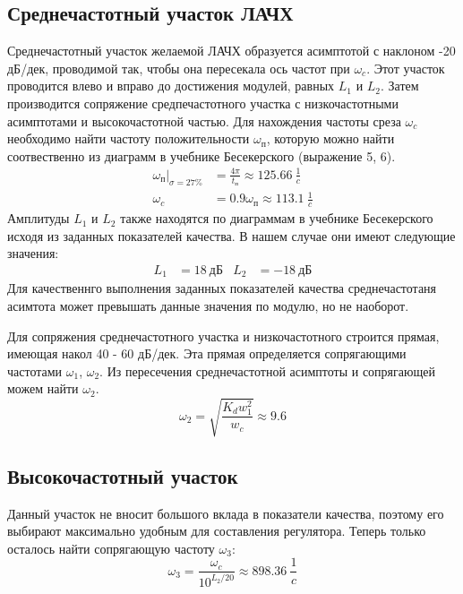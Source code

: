 \documentclass[russian, utf8]{eskdtext}
\begin{document}
\subsection{Среднечастотный участок ЛАЧХ}
Среднечастотный участок желаемой ЛАЧХ образуется асимптотой с наклоном -20 дБ/дек, проводимой так, чтобы она пересекала ось частот при $\omega_c$. Этот участок проводится влево и вправо до достижения модулей, равных $L_1$ и $L_2$. Затем производится сопряжение средпечастотного участка с низкочастотными асимптотами и высокочастотной частью. Для нахождения частоты среза $\omega_c$ необходимо найти частоту положительности $\omega_\text{п}$, которую можно найти соотвественно из диаграмм в учебнике Бесекерского (выражение 5, 6).
\begin{align}
    \omega_\text{п}|_{\sigma = 27\%} & = \frac{4\pi}{t_\text{п}} \approx 125.66\ \frac{1}{c} \\
    \omega_c & = 0.9\omega_\text{п} \approx 113.1\ \frac{1}{c} 
\end{align}
Амплитуды $L_1$ и $L_2$ также находятся по диаграммам в учебнике Бесекерского исходя из заданных показателей качества. В нашем случае они имеют следующие значения:
\begin{align*}
    L_1 & = 18\ \text{дБ} & L_2 & = -18\ \text{дБ}
\end{align*}
Для качественнго выполнения заданных показателей качества среднечастотаня асимтота может превышать данные значения по модулю, но не наоборот. \par
Для сопряжения среднечастотного участка и низкочастотного строится прямая, имеющая накол 40 - 60 дБ/дек. Эта прямая определяется сопрягающими частотами $\omega_1$, $\omega_2$. Из пересечения среднечастотной асимптоты и сопрягающей можем найти $\omega_2$.
\begin{equation}
    \omega_2 = \sqrt{\frac{K_dw_1^2}{w_c}} \approx 9.6
\end{equation}\par

\subsection{Высокочастотный участок}
Данный участок не вносит большого вклада в показатели качества, поэтому его выбирают максимально удобным для составления регулятора.
Теперь только осталось найти сопрягающую частоту $\omega_{3}$:
\begin{equation}
    \omega_{3} = \frac{\omega_c}{10^{L_2/20}} \approx 898.36\ \frac{1}{c}
\end{equation}
\end{document}

